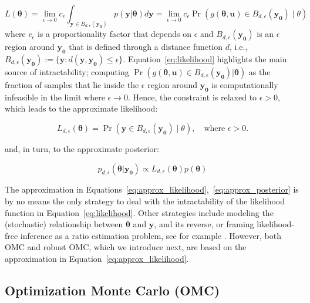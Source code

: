 \documentclass[article]{jss}
\newcommand{\ub}{\mathbf{u}}
\newcommand{\yb}{\mathbf{y}}
\newcommand{\thetab}{\boldsymbol{\theta}}
\newcommand{\simulator}{g}
\newcommand{\region}{B_{d,\epsilon}}
\newcommand{\data}{\mathbf{y_0}}
\begin{document}
\begin{equation}
  \label{eq:likelihood}
  L(\thetab) = \lim_{\epsilon \to 0} c_\epsilon \int_{\yb \in B_{d,\epsilon}(\data)} p(\yb|\thetab)d\yb =
  \lim_{\epsilon \to 0} c_\epsilon \Pr(\simulator(\thetab, \ub) \in \region(\data)  \mid \theta)
\end{equation}
where \(c_\epsilon\) is a proportionality factor that depends on
\(\epsilon\) and \(\region(\data)\) is an \(\epsilon\) region around
\(\data\) that is defined through a distance function \(d\), i.e., \
\(\region(\data) := \{\yb: d(\yb, \data) \leq \epsilon
\}\). Equation~\ref{eq:likelihood} highlights the main source of
intractability; computing
\(\Pr(\simulator(\thetab,\ub) \in \region(\data) | \thetab) \) as the
fraction of samples that lie inside the \(\epsilon\) region around
\(\data\) is computationally infeasible in the limit where
\(\epsilon \to 0\). Hence, the constraint is relaxed to
\(\epsilon > 0\), which leads to the approximate likelihood:

\begin{equation}
  \label{eq:approx_likelihood}
  L_{d, \epsilon}(\thetab) = \Pr(\yb \in \region(\data) \mid \theta), \quad \text{where  } \epsilon > 0.
\end{equation}

and, in turn, to the approximate posterior:

\begin{equation} \label{eq:approx_posterior}
  p_{d,\epsilon}(\thetab|\data)
  \propto L_{d, \epsilon}(\thetab) p(\thetab)
\end{equation}

The approximation in
Equations~\ref{eq:approx_likelihood},~\ref{eq:approx_posterior} is by
no means the only strategy to deal with the intractability of the
likelihood function in Equation~\ref{eq:likelihood}. Other strategies include
modeling the (stochastic) relationship between \(\thetab\) and
\(\yb\), and its reverse, or framing likelihood-free inference as a
ratio estimation problem, see for example \citet{blum2010, Wood2006,
  Papamakarios2016, Papamakarios2019, Chen2019, Thomas2020,
  Hermans2020}. However, both OMC and robust OMC, which we introduce
next, are based on the approximation in Equation~\ref{eq:approx_likelihood}.

\subsection{Optimization Monte Carlo (OMC)}
\end{document}

